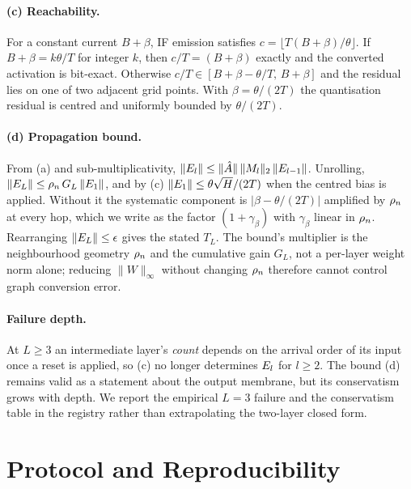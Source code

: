 \paragraph{(c) Reachability.} For a constant current $B+\beta$, IF emission satisfies
$c=\lfloor T(B+\beta)/\theta\rfloor$. If $B+\beta=k\theta/T$ for integer $k$, then
$c/T=(B+\beta)$ exactly and the converted activation is bit-exact. Otherwise
$c/T\in[B+\beta-\theta/T,\,B+\beta]$ and the residual lies on one of two adjacent grid points.
With $\beta=\theta/(2T)$ the quantisation residual is centred and uniformly bounded by
$\theta/(2T)$.

\paragraph{(d) Propagation bound.} From (a) and sub-multiplicativity,
$\|E_l\|\le \|\hat{A}\|\,\|M_l\|_2\,\|E_{l-1}\|$. Unrolling,
$\|E_L\|\le \rho_n\, G_L\,\|E_1\|$, and by (c)
$\|E_1\|\le \theta\sqrt{H}/(2T)$ when the centred bias is applied. Without it the
systematic component is $|\beta-\theta/(2T)|$ amplified by $\rho_n$ at every hop, which we write
as the factor $(1+\gamma_\beta)$ with $\gamma_\beta$ linear in $\rho_n$. Rearranging
$\|E_L\|\le\epsilon$ gives the stated $T_L$. The bound's multiplier is the neighbourhood
geometry $\rho_n$ and the cumulative gain $G_L$, not a per-layer weight norm alone; reducing
$\|W\|_\infty$ without changing $\rho_n$ therefore cannot control graph conversion error.

\paragraph{Failure depth.} At $L\ge3$ an intermediate layer's \emph{count} depends on the
arrival order of its input once a reset is applied, so (c) no longer determines $E_l$
for $l\ge2$. The bound (d) remains valid as a statement about the output membrane, but its
conservatism grows with depth. We report the empirical $L=3$ failure and the conservatism
table in the registry rather than extrapolating the two-layer closed form.

\section{Protocol and Reproducibility}
\label{app:protocol}

